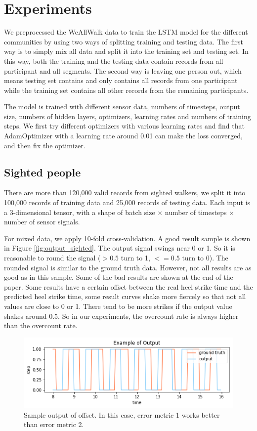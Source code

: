 \documentclass[11pt]{article}
\begin{document}
{\section{Experiments}

We preprocessed the WeAllWalk data to train the LSTM model for the different communities by using two ways of splitting training and testing data. The first way is to simply mix all data and split it into the training set and testing set. In this way, both the training and the testing data contain records from all participant and all segments. The second way is leaving one person out, which means testing set contains and only contains all records from one participant while the training set contains all other records from the remaining participants.

The model is trained with different sensor data, numbers of timesteps, output size, numbers of hidden layers, optimizers, learning rates and numbers of training steps. We first try different optimizers with various learning rates and find that AdamOptimizer with a learning rate around 0.01 can make the loss converged, and then fix the optimizer. 


\subsection{Sighted people}
There are more than 120,000 valid records from sighted walkers, we split it into 100,000 records of training data and 25,000 records of testing data. Each input is a 3-dimensional tensor, with a shape of batch size $\times$ number of timesteps $\times$ number of sensor signals.

For mixed data, we apply 10-fold cross-validation. A good result sample is shown in Figure \ref{fig:output_sighted}. The output signal swings near 0 or 1. So it is reasonable to round the signal ($>0.5$ turn to 1, $<=0.5$ turn to 0). The rounded signal is similar to the ground truth data. However, not all results are as good as in this sample. Some of the bad results are shown at the end of the paper. Some results have a certain offset between the real heel strike time and the predicted heel strike time, some result curves shake more fiercely so that not all values are close to 0 or 1. There tend to be more strikes if the output value shakes around 0.5. So in our experiments, the overcount rate is always higher than the overcount rate.

\begin{figure}[ht]
\centering
\includegraphics[scale=0.4]{output_ex_offset}
\caption{Sample output of offset. In this case, error metric 1 works better than error metric 2.}
\label{fig:output_ex_offset}
\end{figure}


}
\end{document}

